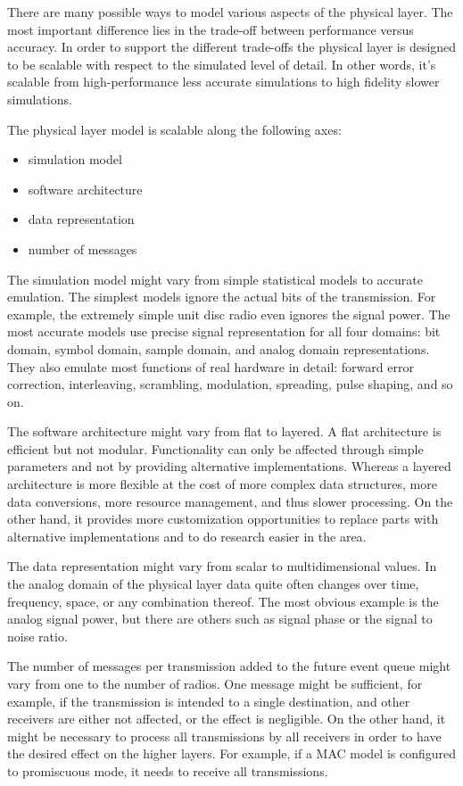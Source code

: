 There are many possible ways to model various aspects of the physical layer.
The most important difference lies in the trade-off between performance versus
accuracy. In order to support the different trade-offs the physical layer is
designed to be scalable with respect to the simulated level of detail. In other
words, it's scalable from high-performance less accurate simulations to high
fidelity slower simulations.

The physical layer model is scalable along the following axes:

\begin{itemize}
  \item simulation model
  \item software architecture
  \item data representation
  \item number of messages
\end{itemize}

The simulation model might vary from simple statistical models to accurate
emulation. The simplest models ignore the actual bits of the transmission. For
example, the extremely simple unit disc radio even ignores the signal power. The
most accurate models use precise signal representation for all four domains:
bit domain, symbol domain, sample domain, and analog domain representations.
They also emulate most functions of real hardware in detail: forward error
correction, interleaving, scrambling, modulation, spreading, pulse shaping, and
so on.

The software architecture might vary from flat to layered. A flat architecture
is efficient but not modular. Functionality can only be affected through simple
parameters and not by providing alternative implementations. Whereas a layered
architecture is more flexible at the cost of more complex data structures, more
data conversions, more resource management, and thus slower processing. On the
other hand, it provides more customization opportunities to replace parts with
alternative implementations and to do research easier in the area.

The data representation might vary from scalar to multidimensional values. In
the analog domain of the physical layer data quite often changes over time,
frequency, space, or any combination thereof. The most obvious example is the
analog signal power, but there are others such as signal phase or the signal to
noise ratio.

The number of messages per transmission added to the future event queue might
vary from one to the number of radios. One message might be sufficient, for
example, if the transmission is intended to a single destination, and other
receivers are either not affected, or the effect is negligible. On the other
hand, it might be necessary to process all transmissions by all receivers in
order to have the desired effect on the higher layers. For example, if a MAC
model is configured to promiscuous mode, it needs to receive all transmissions.

